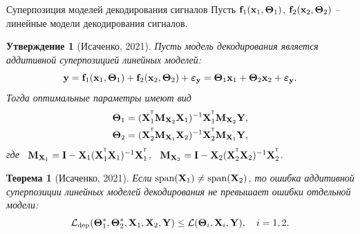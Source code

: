 \documentclass[10pt]{beamer}
\newtheorem{statement}{Утверждение}
\newtheorem{rustheorem}{Теорема}
\begin{document}
\begin{frame}{Суперпозиция моделей декодирования сигналов}
	Пусть $\mathbf{f}_1(\bx_1, \bTheta_1)$, $\mathbf{f}_2(\bx_2, \bTheta_2)$ -- линейные модели декодирования сигналов. 
	\begin{statement}[Исаченко, 2021]
		Пусть модель декодирования является аддитивной суперпозицией линейных моделей:
		\[
			\by = \mathbf{f}_1(\bx_1, \bTheta_1) + \mathbf{f}_2(\bx_2, \bTheta_2) + \boldsymbol{\varepsilon}_{\by} = \bTheta_1 \bx_1 + \bTheta_2 \bx_2 + \boldsymbol{\varepsilon}_{\by}.
		\]
		Тогда оптимальные параметры имеют вид
		\vspace{-0.2cm}
		\begin{align*}
			\bTheta_1 &= (\bX_1^{\T} \bM_{\bX_2} \bX_1)^{-1} \bX_1^{\T} \bM_{\bX_2} \bY, \\
			\bTheta_2 &= (\bX_2^{\T} \bM_{\bX_1} \bX_2)^{-1} \bX_2^{\T} \bM_{\bX_1} \bY,
		\end{align*}
		где \, $\bM_{\bX_1} = \bI - \bX_1 (\bX_1^{\T} \bX_1)^{-1} \bX_1^{\T}$, \, $\bM_{\bX_2} = \bI -\bX_2 (\bX_2^{\T} \bX_2)^{-1} \bX_2^{\T}$.
	\end{statement}
	\begin{rustheorem}[Исаченко, 2021]
		Если $\text{span}(\bX_1) \neq \text{span}(\bX_2)$, то ошибка аддитивной суперпозиции линейных моделей декодирования не превышает ошибки отдельной модели:
		\[
			\mathcal{L}_{\textnormal{dep}}(\bTheta_1^*, \bTheta_2^*, \bX_1, \bX_2, \bY) \leq \mathcal{L}(\bTheta_i, \bX_i, \bY), \quad i = 1, 2.
		\]
	\end{rustheorem}
\end{frame}
\end{document}
